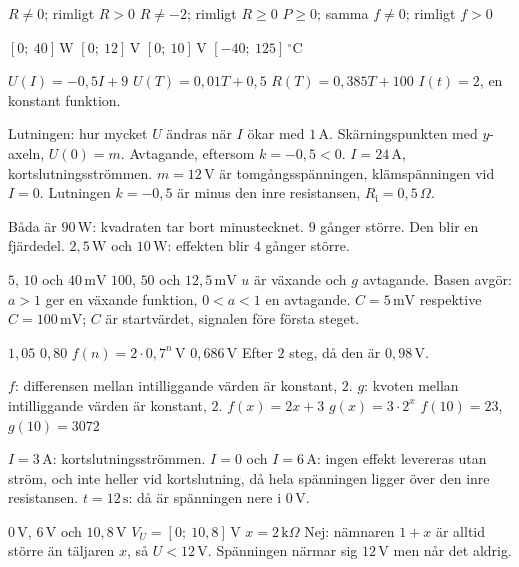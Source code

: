 \begin{facit}
  $R \neq 0$; rimligt $R > 0$  $R \neq -2$; rimligt $R \geq 0$
 $P \geq 0$; samma  $f \neq 0$; rimligt $f > 0$

  $[0;\ 40]\,\text{W}$  $[0;\ 12]\,\text{V}$  $[0;\ 10]\,\text{V}$
 $[-40;\ 125]\,^{\circ}\text{C}$

  $U(I) = -0{,}5I + 9$  $U(T) = 0{,}01T + 0{,}5$
 $R(T) = 0{,}385T + 100$  $I(t) = 2$, en konstant funktion.

  Lutningen: hur mycket $U$ ändras när $I$ ökar med $1\,\text{A}$.
 Skärningspunkten med $y$-axeln, $U(0) = m$.
 Avtagande, eftersom $k = -0{,}5 < 0$.
 $I = 24\,\text{A}$, kortslutningsströmmen.
 $m = 12\,\text{V}$ är tomgångsspänningen, klämspänningen vid $I = 0$. Lutningen $k = -0{,}5$
är minus den inre resistansen, $R_{\text{i}} = 0{,}5\,\Omega$.

  Båda är $90\,\text{W}$: kvadraten tar bort minustecknet.
 $9$ gånger större.  Den blir en fjärdedel.
 $2{,}5\,\text{W}$ och $10\,\text{W}$: effekten blir $4$ gånger större.

  $5$, $10$ och $40\,\text{mV}$  $100$, $50$ och $12{,}5\,\text{mV}$
 $u$ är växande och $g$ avtagande. Basen avgör: $a > 1$ ger en växande funktion,
$0 < a < 1$ en avtagande.
 $C = 5\,\text{mV}$ respektive $C = 100\,\text{mV}$; $C$ är startvärdet, signalen före
första steget.

  $1{,}05$  $0{,}80$  $f(n) = 2 \cdot 0{,}7^n\,\text{V}$
 $0{,}686\,\text{V}$  Efter $2$ steg, då den är $0{,}98\,\text{V}$.

  $f$: differensen mellan intilliggande värden är konstant, $2$.
 $g$: kvoten mellan intilliggande värden är konstant, $2$.
 $f(x) = 2x + 3$  $g(x) = 3 \cdot 2^x$  $f(10) = 23$, $g(10) = 3072$

  $I = 3\,\text{A}$: kortslutningsströmmen.
 $I = 0$ och $I = 6\,\text{A}$: ingen effekt levereras utan ström, och inte heller vid
kortslutning, då hela spänningen ligger över den inre resistansen.
 $t = 12\,\text{s}$: då är spänningen nere i $0\,\text{V}$.

  $0\,\text{V}$, $6\,\text{V}$ och $10{,}8\,\text{V}$
 $V_U = [0;\ 10{,}8]\,\text{V}$
 $x = 2\,\text{k}\Omega$
 Nej: nämnaren $1 + x$ är alltid större än täljaren $x$, så $U < 12\,\text{V}$. Spänningen
närmar sig $12\,\text{V}$ men når det aldrig.


\end{facit}
